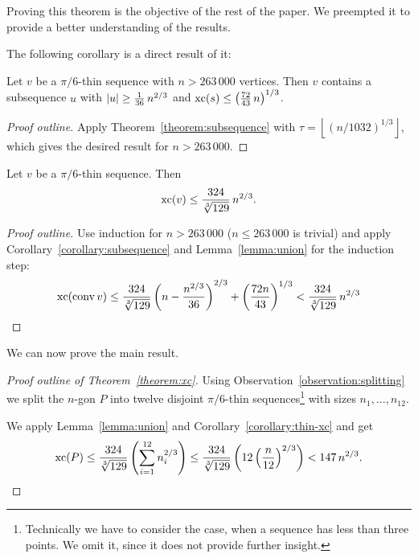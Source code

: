 Proving this theorem is the objective of the rest of the paper. We preempted it to provide a better understanding of the results.

The following corollary is a direct result of it:

\begin{corollary}\label{corollary:subsequence}
  Let $v$ be a $\pi/6$-thin sequence with $n > 263\,000$ vertices.
  Then $v$ contains a subsequence $u$ with $\lvert u\rvert \geq \frac{1}{36}\,n^{2/3}$ and $\operatorname{xc}(s) \leq \left( \frac{72}{43}\,n \right)^{1/3}$.
\end{corollary}

\begin{proof}[Proof outline]
  Apply Theorem~\ref{theorem:subsequence} with $\tau=\left\lfloor (n/1032)^{1/3} \right\rfloor$, which gives the desired result for $n > 263\,000$.
\end{proof}

\begin{corollary}\label{corollary:thin-xc}
  Let $v$ be a $\pi/6$-thin sequence. Then $$\operatorname{xc}(v) \leq \frac{324}{\sqrt[3]{129}}\,n^{2/3} .$$
\end{corollary}

\begin{proof}[Proof outline]
  Use induction for $n > 263\,000$ ($n \leq 263\,000$ is trivial) and apply Corollary~\ref{corollary:subsequence} and Lemma~\ref{lemma:union} for the induction step: $$\operatorname{xc}(\operatorname{conv} v) \leq \frac{324}{\sqrt[3]{129}} \left(n-\frac{n^{2/3}}{36}\right)^{2/3}+\left(\frac{72n}{43}\right)^{1/3} < \frac{324}{\sqrt[3]{129}}\,n^{2/3}$$
\end{proof}

We can now prove the main result.

\begin{proof}[Proof outline of Theorem~\ref{theorem:xc}]
  Using Observation~\ref{observation:splitting} we split the $n$-gon $P$ into twelve disjoint $\pi/6$-thin sequences\footnote{Technically we have to consider the case, when a sequence has less than three points. We omit it, since it does not provide further insight.} with sizes $n_1,\dots,n_{12}$.

  We apply Lemma~\ref{lemma:union} and Corollary~\ref{corollary:thin-xc} and get $$\operatorname{xc}(P)\leq\frac{324}{\sqrt[3]{129}}\left(\sum\limits_{i=1}^{12}n_i^{2/3}\right)\leq\frac{324}{\sqrt[3]{129}}\left(12\left(\frac{n}{12}\right)^{2/3}\right) < 147\,n^{2/3} .$$
\end{proof}



